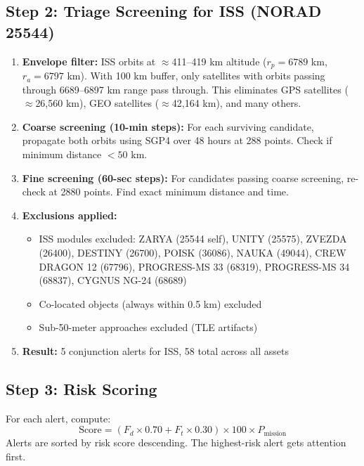 \documentclass[12pt,a4paper]{article}
\begin{document}
\subsection{Step 2: Triage Screening for ISS (NORAD 25544)}

\begin{enumerate}
    \item \textbf{Envelope filter:} ISS orbits at $\approx$411--419 km altitude ($r_p = 6789$ km, $r_a = 6797$ km). With 100 km buffer, only satellites with orbits passing through 6689--6897 km range pass through. This eliminates GPS satellites ($\approx$26,560 km), GEO satellites ($\approx$42,164 km), and many others.
    
    \item \textbf{Coarse screening (10-min steps):} For each surviving candidate, propagate both orbits using SGP4 over 48 hours at 288 points. Check if minimum distance $< 50$ km.
    
    \item \textbf{Fine screening (60-sec steps):} For candidates passing coarse screening, re-check at 2880 points. Find exact minimum distance and time.
    
    \item \textbf{Exclusions applied:}
    \begin{itemize}
        \item ISS modules excluded: ZARYA (25544 self), UNITY (25575), ZVEZDA (26400), DESTINY (26700), POISK (36086), NAUKA (49044), CREW DRAGON 12 (67796), PROGRESS-MS 33 (68319), PROGRESS-MS 34 (68837), CYGNUS NG-24 (68689)
        \item Co-located objects (always within 0.5 km) excluded
        \item Sub-50-meter approaches excluded (TLE artifacts)
    \end{itemize}
    
    \item \textbf{Result:} 5 conjunction alerts for ISS, 58 total across all assets
\end{enumerate}

\subsection{Step 3: Risk Scoring}
For each alert, compute:
\[
\text{Score} = (F_d \times 0.70 + F_t \times 0.30) \times 100 \times P_{\text{mission}}
\]
Alerts are sorted by risk score descending. The highest-risk alert gets attention first.
\end{document}
